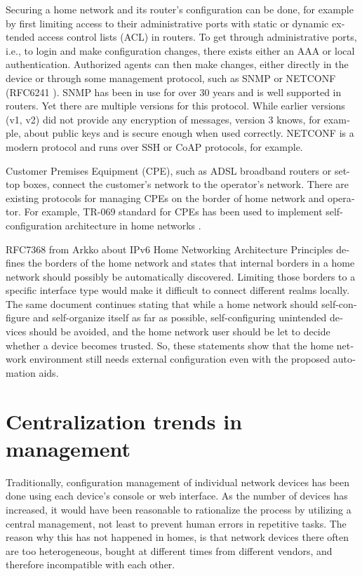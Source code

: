 \documentclass[12pt,a4paper,english]{tutthesis}
\begin{document}
\begin{otherlanguage}{english}
Securing a home network and its router's configuration can be done, for
example by first limiting access to their administrative ports
with static or dynamic extended access control lists (ACL) in
routers. To get through administrative ports, i.e., to login and make
configuration changes, there exists either an AAA or  local authentication.
Authorized agents can then make changes, either directly in the device
or through some management protocol, such as SNMP or NETCONF (RFC6241
\cite{rfc6241}).  SNMP has been in use for over 30 years and is well
supported in routers. Yet there are multiple versions for this
protocol. While earlier versions (v1, v2) did not provide any
encryption of messages, version 3 knows, for example, about public keys
and is secure enough when used correctly. NETCONF is a modern protocol
and runs over SSH or CoAP protocols, for example.


Customer Premises Equipment (CPE), such as ADSL broadband routers or
set-top boxes, connect the customer's network to the operator's network.
There are existing protocols for managing  CPEs on the border of home
network and operator. For example,  TR-069 standard \cite{iptvtr069} for CPEs
has been used to implement self-configuration archi\-tecture in
home networks \cite{tr069rachidi2011}.


RFC7368 \cite{rfc7368} from Arkko about IPv6 Home Networking Architecture Principles 
defines the borders of the home network and states that
internal borders in a home network should possibly be automatically
discovered. Limiting those borders to a specific
interface type would make it difficult to connect different realms locally.
The same document continues stating
that while a home network should self-configure and self-organize itself as
far as possible, self-configuring unintended devices should be
avoided, and the home network user should be let to decide whether a device becomes trusted.
So, these statements show that the home network environment still needs
external configuration even with the proposed automation aids.

\section{Centralization trends in management}
\label{sec-3-2}

Traditionally, configuration management of individual network devices has been done
using each device's console or web interface.  As the number of
devices has increased, it would have been reasonable to rationalize
the process by utilizing a central management, not least to prevent human
errors in repetitive tasks.  The reason why this has not happened in
homes, is that network devices there often are too heterogeneous, bought at different times from different vendors,
and therefore incompatible with each other.


\end{otherlanguage}
\end{document}

